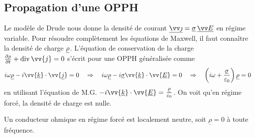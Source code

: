 \documentclass[12pt,fancy]{cours}
\begin{document}

\subsection{Propagation d’une OPPH}

Le modèle de Drude nous donne la densité de courant $\udl{\j} = \udl{\sigma}\, \udl{\E}$
en régime variable. Pour résoudre complètement les équations de Maxwell, il faut connaître la densité de charge $\underline{\rho}$. L'équation de conservation de la charge $\frac{\partial\rho}{\partial t}+\dive{\vv{j}}=0$ s'écrit pour une OPPH généralisée comme
\begin{equation}
  i\omega\underline{\rho}-i\vv{\underline{k}}\cdot\vv{\underline{j}}=0 \Rar  i\omega\underline{\rho}-i\underline{\sigma}\vv{\underline{k}}\cdot\vv{\underline{E}}=0 \Rar   \left(i\omega+\frac{\underline{\sigma}}{\varepsilon_0}\right)\underline{\rho}=0
\end{equation}
en utilisant l'équation de M.G. $-i\vv{\underline{k}}\cdot\vv{\underline{E}}=\frac{\underline{\rho}}{\varepsilon_0}$. On voit qu'en régime forcé, la densité de charge est nulle.
\begin{prop}\label{prop:}
Un conducteur ohmique en régime forcé est localement neutre, soit $\underline{\rho}=0$ à toute fréquence.
\end{prop}

\end{document}
